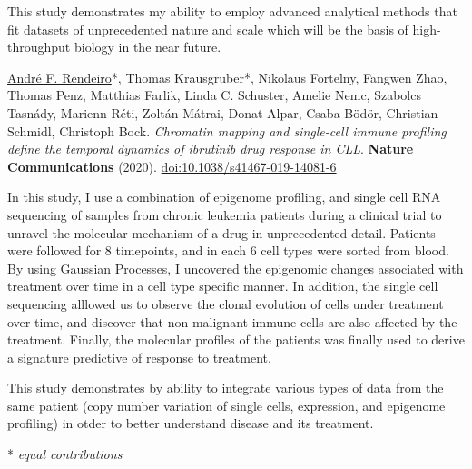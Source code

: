 \documentclass[11pt,a4paper,roman]{moderncv} %
\begin{document}
\begin{list}{--}{}
        This study demonstrates my ability to employ advanced analytical methods that fit datasets of unprecedented nature and scale which will be the basis of high-throughput biology in the near future.

    \item{}
        {\underline{André F. Rendeiro}*, Thomas Krausgruber*, Nikolaus Fortelny, Fangwen Zhao, Thomas Penz, Matthias Farlik, Linda C. Schuster, Amelie Nemc, Szabolcs Tasnády, Marienn Réti, Zoltán Mátrai, Donat Alpar, Csaba Bödör, Christian Schmidl, Christoph Bock. \textit{Chromatin mapping and single-cell immune profiling define the temporal dynamics of ibrutinib drug response in CLL}. \textbf{Nature Communications} (2020). \href{https://dx.doi.org/10.1038/s41467-019-14081-6}{doi:10.1038/s41467-019-14081-6}}

        In this study, I use a combination of epigenome profiling, and single cell RNA sequencing of samples from chronic leukemia patients during a clinical trial to unravel the molecular mechanism of a drug in unprecedented detail. Patients were followed for 8 timepoints, and in each 6 cell types were sorted from blood. By using Gaussian Processes, I uncovered the epigenomic changes associated with treatment over time in a cell type specific manner. In addition, the single cell sequencing alllowed us to observe the clonal evolution of cells under treatment over time, and discover that non-malignant immune cells are also affected by the treatment. Finally, the molecular profiles of the patients was finally used to derive a signature predictive of response to treatment.

        This study demonstrates by ability to integrate various types of data from the same patient (copy number variation of single cells, expression, and epigenome profiling) in otder to better understand disease and its treatment.

\end{list}

* \textit{equal contributions}
\end{document}
